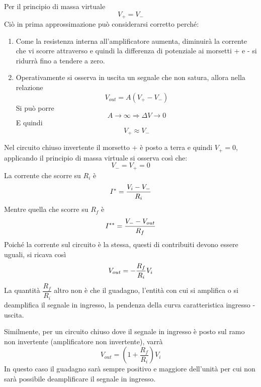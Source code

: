 \documentclass[a4paper, 12pt, twoside]{report}
\begin{document}
	\begin{figure}[H]
		\centering
	\end{figure}
	
	Per il principio di massa virtuale 
	\[V_+ = V_-\]
	Ciò in prima approssimazione può considerarsi corretto perché:
	\begin{enumerate}
		\item Come la resistenza interna all'amplificatore aumenta, diminuirà la corrente che vi scorre attraverso e quindi la differenza di potenziale ai morsetti + e - si ridurrà fino a tendere a zero.
		\item Operativamente si osserva in uscita un segnale che non satura, allora nella relazione \[V_{out} = A(V_+-V_-)\] Si può porre \[A\rightarrow\infty \Rightarrow \Delta V\rightarrow0\] E quindi \[V_+\approx V_-\]
	\end{enumerate}
	
	Nel circuito chiuso invertente il morsetto + è posto a terra e quindi $V_+=0$, applicando il principio di massa virtuale si osserva così che:
	\[V_- = V_+ = 0\]
	La corrente che scorre su $R_i$ è
	\[I^* = {V_i-V_-\over R_i}\]
	Mentre quella che scorre su $R_f$ è 
	\[I^{**} = {V_--V_{out}\over R_f} \]
	Poiché la corrente sul circuito è la stessa, questi di contribuiti devono essere uguali, si ricava così
	\begin{equation}\label{eq:1}
		V_{out} = -{R_f\over R_i}V_i
	\end{equation}
	La quantità $\dfrac{R_f}{R_i}$ altro non è che il guadagno, l'entità con cui si amplifica o si deamplifica il segnale in ingresso, la pendenza della curva caratteristica ingresso - uscita. \newline 
	

	Similmente, per un circuito chiuso dove il segnale in ingresso è posto sul ramo non invertente (amplificatore non invertente), varrà 
	\[V_{out} = \left(1+\dfrac{R_f}{R_i}\right)V_i\]
	In questo caso il guadagno sarà sempre positivo e maggiore dell'unità per cui non sarà possibile deamplificare il segnale in ingresso.
			
\end{document}

